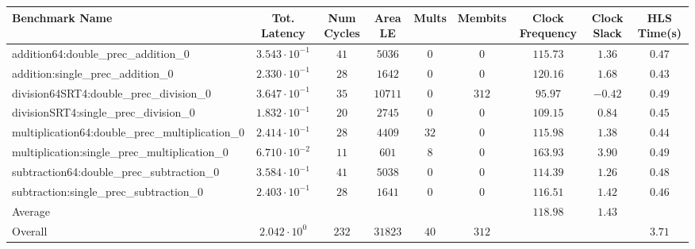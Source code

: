 \begin{tabular}{|l|c|c|c|c|c|c|c|c|}
\hline
Benchmark Name                                   & Tot. Latency            & Num Cycles & Area LE   & Mults  & Membits & Clock Frequency & Clock Slack & HLS Time(s) \\
\hline
addition64:double\_prec\_addition\_0             & $ 3.543 \cdot 10^{-1} $ & $ 41     $ & $ 5036  $ & $ 0  $ & $ 0   $ & $ 115.73      $ & $ 1.36    $ & $ 0.47    $ \\
addition:single\_prec\_addition\_0               & $ 2.330 \cdot 10^{-1} $ & $ 28     $ & $ 1642  $ & $ 0  $ & $ 0   $ & $ 120.16      $ & $ 1.68    $ & $ 0.43    $ \\
division64SRT4:double\_prec\_division\_0         & $ 3.647 \cdot 10^{-1} $ & $ 35     $ & $ 10711 $ & $ 0  $ & $ 312 $ & $ 95.97       $ & $ -0.42   $ & $ 0.49    $ \\
divisionSRT4:single\_prec\_division\_0           & $ 1.832 \cdot 10^{-1} $ & $ 20     $ & $ 2745  $ & $ 0  $ & $ 0   $ & $ 109.15      $ & $ 0.84    $ & $ 0.45    $ \\
multiplication64:double\_prec\_multiplication\_0 & $ 2.414 \cdot 10^{-1} $ & $ 28     $ & $ 4409  $ & $ 32 $ & $ 0   $ & $ 115.98      $ & $ 1.38    $ & $ 0.44    $ \\
multiplication:single\_prec\_multiplication\_0   & $ 6.710 \cdot 10^{-2} $ & $ 11     $ & $ 601   $ & $ 8  $ & $ 0   $ & $ 163.93      $ & $ 3.90    $ & $ 0.49    $ \\
subtraction64:double\_prec\_subtraction\_0       & $ 3.584 \cdot 10^{-1} $ & $ 41     $ & $ 5038  $ & $ 0  $ & $ 0   $ & $ 114.39      $ & $ 1.26    $ & $ 0.48    $ \\
subtraction:single\_prec\_subtraction\_0         & $ 2.403 \cdot 10^{-1} $ & $ 28     $ & $ 1641  $ & $ 0  $ & $ 0   $ & $ 116.51      $ & $ 1.42    $ & $ 0.46    $ \\
\hline
Average                                          & $                     $ & $        $ & $       $ & $    $ & $     $ & $ 118.98      $ & $ 1.43    $ & $         $ \\
\hline
Overall                                          & $ 2.042 \cdot 10^{0}  $ & $ 232    $ & $ 31823 $ & $ 40 $ & $ 312 $ & $             $ & $         $ & $ 3.71    $ \\
\hline
\end{tabular}
